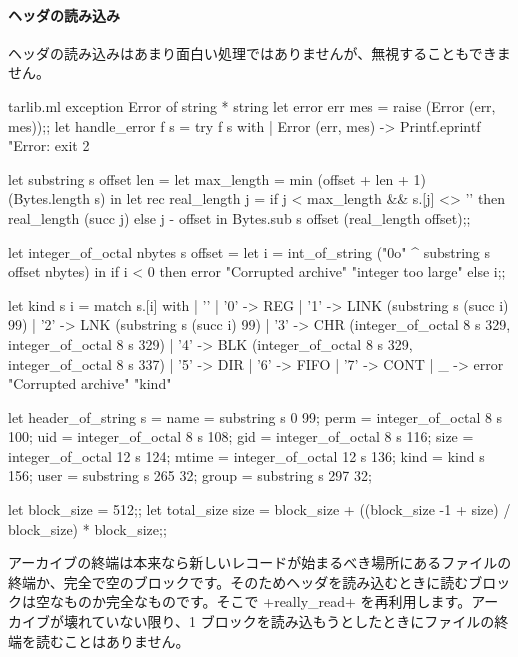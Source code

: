 \paragraph {ヘッダの読み込み}
ヘッダの読み込みはあまり面白い処理ではありませんが、無視することもできません。
%
\begin{listingcodefile}{tarlib.ml}
exception Error of string * string
let error err mes = raise (Error (err, mes));;
let handle_error f s =
  try f s with
  | Error (err, mes) ->
      Printf.eprintf "Error: %
      exit 2

let substring s offset len =
  let max_length = min (offset + len + 1) (Bytes.length s) in
  let rec real_length j =
    if j < max_length && s.[j] <> '' then real_length (succ j)
    else j - offset in
  Bytes.sub s offset (real_length offset);;

let integer_of_octal nbytes s offset =
  let i = int_of_string ("0o" ^ substring s offset nbytes) in
  if i < 0 then error "Corrupted archive" "integer too large" else i;;

let kind s i = match s.[i] with
  | '' | '0' -> REG
  | '1' -> LINK (substring s (succ i) 99)
  | '2' -> LNK (substring s (succ i) 99)
  | '3' -> CHR (integer_of_octal 8 s 329, integer_of_octal 8 s 329)
  | '4' -> BLK (integer_of_octal 8 s 329, integer_of_octal 8 s 337)
  | '5' -> DIR | '6' -> FIFO | '7' -> CONT
  | _ -> error "Corrupted archive" "kind"

let header_of_string s =
  { name = substring s 0 99;
    perm = integer_of_octal 8 s 100;
    uid = integer_of_octal 8 s 108;
    gid = integer_of_octal 8 s 116;
    size = integer_of_octal 12 s 124;
    mtime = integer_of_octal 12 s 136;
    kind = kind s 156;
    user = substring s 265 32;
    group = substring s 297 32; }

let block_size = 512;;
let total_size size =
  block_size + ((block_size -1 + size) / block_size) * block_size;;
\end{listingcodefile}
%
アーカイブの終端は本来なら新しいレコードが始まるべき場所にあるファイルの終端か、完全で空のブロックです。そのためヘッダを読み込むときに読むブロックは空なものか完全なものです。そこで \ml+really_read+ を再利用します。アーカイブが壊れていない限り、1 ブロックを読み込もうとしたときにファイルの終端を読むことはありません。
